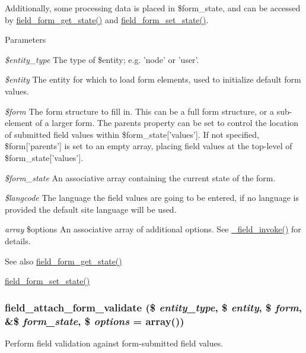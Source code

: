 Additionally, some processing data is placed in \$form\_\-state, and can be accessed by \hyperlink{field_8form_8inc_a84146d3d086bfc6b242f01c23e552435}{field\_\-form\_\-get\_\-state()} and \hyperlink{field_8form_8inc_a8e21a8b058d1a84d91d1a326242e303e}{field\_\-form\_\-set\_\-state()}.


\begin{DoxyParams}{Parameters}
\item[{\em \$entity\_\-type}]The type of \$entity; e.g. 'node' or 'user'. \item[{\em \$entity}]The entity for which to load form elements, used to initialize default form values. \item[{\em \$form}]The form structure to fill in. This can be a full form structure, or a sub-\/element of a larger form. The parents property can be set to control the location of submitted field values within \$form\_\-state\mbox{[}'values'\mbox{]}. If not specified, \$form\mbox{[}'parents'\mbox{]} is set to an empty array, placing field values at the top-\/level of \$form\_\-state\mbox{[}'values'\mbox{]}. \item[{\em \$form\_\-state}]An associative array containing the current state of the form. \item[{\em \$langcode}]The language the field values are going to be entered, if no language is provided the default site language will be used. \item[{\em array}]\$options An associative array of additional options. See \hyperlink{group__field__attach_ga65f891a5eea6513f8505f5cfc5894896}{\_\-field\_\-invoke()} for details.\end{DoxyParams}
\begin{DoxySeeAlso}{See also}
\hyperlink{field_8form_8inc_a84146d3d086bfc6b242f01c23e552435}{field\_\-form\_\-get\_\-state()} 

\hyperlink{field_8form_8inc_a8e21a8b058d1a84d91d1a326242e303e}{field\_\-form\_\-set\_\-state()} 
\end{DoxySeeAlso}
\hypertarget{group__field__attach_ga8c9a9775772774cefae4f6b9959d477e}{
\subsubsection[{field\_\-attach\_\-form\_\-validate}]{\setlength{\rightskip}{0pt plus 5cm}field\_\-attach\_\-form\_\-validate (\$ {\em entity\_\-type}, \/  \$ {\em entity}, \/  \$ {\em form}, \/  \&\$ {\em form\_\-state}, \/  \$ {\em options} = {\ttfamily array()})}}
\label{group__field__attach_ga8c9a9775772774cefae4f6b9959d477e}
Perform field validation against form-\/submitted field values.

